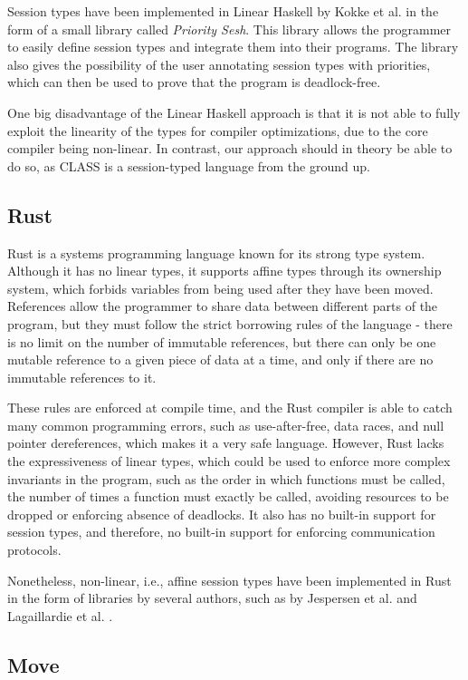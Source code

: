 Session types have been implemented in Linear Haskell by Kokke et al. \cite{Kokke:2021} in the form of a small library called \textit{Priority Sesh}. This library allows the programmer to easily define session types and integrate them into their programs. The library also gives the possibility of the user annotating session types with priorities, which can then be used to prove that the program is deadlock-free.

One big disadvantage of the Linear Haskell approach is that it is not able to fully exploit the linearity of the types for compiler optimizations, due to the core compiler being non-linear. In contrast, our approach should in theory be able to do so, as \ac{CLASS} is a session-typed language from the ground up.

\subsection{Rust}

Rust is a systems programming language known for its strong type system. Although it has no linear types, it supports affine types through its ownership system, which forbids variables from being used after they have been moved. References allow the programmer to share data between different parts of the program, but they must follow the strict borrowing rules of the language - there is no limit on the number of immutable references, but there can only be one mutable reference to a given piece of data at a time, and only if there are no immutable references to it.

These rules are enforced at compile time, and the Rust compiler is able to catch many common programming errors, such as use-after-free, data races, and null pointer dereferences, which makes it a very safe language. However, Rust lacks the expressiveness of linear types, which could be used to enforce more complex invariants in the program, such as the order in which functions must be called, the number of times a function must exactly be called, avoiding resources to be dropped or enforcing absence of deadlocks. It also has no built-in support for session types, and therefore, no built-in support for enforcing communication protocols.

Nonetheless, non-linear, i.e., affine session types have been implemented in Rust in the form of libraries by several authors, such as by Jespersen et al. \cite{Jespersen:2015} and Lagaillardie et al. \cite{Lagaillardie:2022}.

\subsection{Move}

